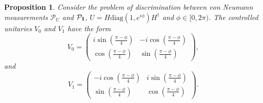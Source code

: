 \documentclass[preprint,12pt, a4paper, dvipsnames]{elsarticle}
\newcommand{\1}{{\rm 1\hspace{-0.9mm}l}}
\newcommand{\PP}{\mathcal{P}}
\newcommand{\diag}{\mathrm{diag}}
\newtheorem{proposition}{Proposition}
\begin{document}
\begin{proposition}\label{prop:optimal-measurement}
	Consider the problem of discrimination between von Neumann measurements $\PP_U$
	and $\PP_\1$, $U = H\diag(1, e^{i \phi}) H^\dagger $ and $\phi \in [0,
	2\pi)$.
	The   controlled unitaries $V_0$ and $V_1$
	have the form
	\begin{equation}
	V_0 = \left(\begin{array}{cc}i \sin\left( \frac{\pi - \phi}{4} \right)&-i
	\cos\left( \frac{\pi - \phi}{4} \right)\\ \cos\left( \frac{\pi -
		\phi}{4}\right)& \sin\left( \frac{\pi - \phi}{4} \right)\end{array}\right),
	\end{equation}
	and
	\begin{equation}
	V_1 = \left(\begin{array}{cc}-i \cos\left(\frac{\pi - \phi}{4}\right) &i
	\sin\left( \frac{\pi - \phi}{4}\right)\\\sin\left( \frac{\pi - \phi}{4} \right)
	&  \cos\left( \frac{\pi - \phi}{4} \right) \end{array}\right).
	\end{equation}
\end{proposition}
\end{document}
